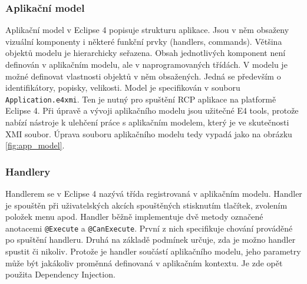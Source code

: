 \documentclass[ing,male,java,dept460]{diploma}		%
\begin{document}
\subsubsection{Aplikační model}
Aplikační model v Eclipse 4 popisuje strukturu aplikace. Jsou v něm obsaženy vizuální komponenty i některé funkční prvky (handlers, commands). Většina objektů modelu je hierarchicky seřazena. Obsah jednotlivých komponent není definován v aplikačním modelu, ale v naprogramovaných třídách. V modelu je možné definovat vlastnosti objektů v něm obsažených. Jedná se především o identifikátory, popisky, velikosti. Model je specifikován v souboru \texttt{Application.e4xmi}. Ten je nutný pro spuštění RCP aplikace na platformě Eclipse 4. Při úpravě a vývoji aplikačního modelu jsou užitečné E4 tools, protože nabízí nástroje k ulehčení práce s aplikačním modelem, který je ve skutečnosti XMI soubor. Úprava souboru aplikačního modelu tedy vypadá jako na obrázku \ref{fig:app_model}.

\subsubsection{Handlery}
Handlerem se v Eclipse 4 nazývá třída registrovaná v aplikačním modelu. Handler je spouštěn při uživatelských akcích spouštěných stisknutím tlačítek, zvolením položek menu apod. Handler běžně implementuje dvě metody označené anotacemi \texttt{@Execute} a \texttt{@CanExecute}. První z nich specifikuje chování prováděné po spuštění handleru. Druhá na základě podmínek určuje, zda je možno handler spustit či nikoliv. Protože je handler součástí aplikačního modelu, jeho parametry může být jakákoliv proměnná definovaná v aplikačním kontextu. Je zde opět použita Dependency Injection\cite{vogellaE4book}.
\end{document}
